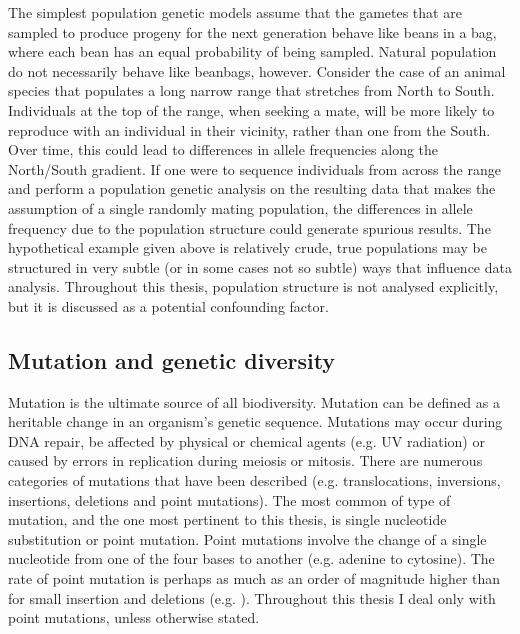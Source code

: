 	The simplest population genetic models assume that the gametes that are sampled to produce progeny for the next generation behave like beans in a bag, where each bean has an equal probability of being sampled. Natural population do not necessarily behave like beanbags, however. Consider the case of an animal species that populates a long narrow range that stretches from North to South. Individuals at the top of the range, when seeking a mate, will be more likely to reproduce with an individual in their vicinity, rather than one from the South. Over time, this could lead to differences in allele frequencies along the North/South gradient. If one were to sequence individuals from across the range and perform a population genetic analysis on the resulting data that makes the assumption of a single randomly mating population, the differences in allele frequency due to the population structure could generate spurious results. The hypothetical example given above is relatively crude, true populations may be structured in very subtle (or in some cases not so subtle) ways that influence data analysis. Throughout this thesis, population structure is not analysed explicitly, but it is discussed as a potential confounding factor.

\subsection{Mutation and genetic diversity}

	Mutation is the ultimate source of all biodiversity. Mutation can be defined as a heritable change in an organism's genetic sequence. Mutations may occur during DNA repair, be affected by physical or chemical agents (e.g. UV radiation) or caused by errors in replication during meiosis or mitosis. There are numerous categories of mutations that have been described (e.g. translocations, inversions, insertions, deletions and point mutations). The most common of type of mutation, and the one most pertinent to this thesis, is single nucleotide substitution or point mutation. Point mutations involve the change of a single nucleotide from one of the four bases to another (e.g. adenine to cytosine). The rate of point mutation is perhaps as much as an order of magnitude higher than for small insertion and deletions (e.g. \citealt{RN387}). Throughout this thesis I deal only with point mutations, unless otherwise stated.

